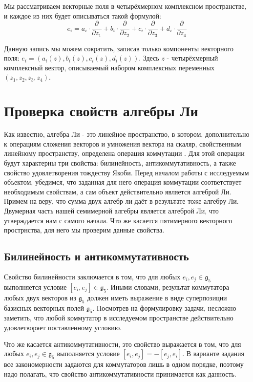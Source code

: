 \documentclass[a4paper]{article}
\begin{document}
Мы рассматриваем векторные поля в четырёхмерном комплексном пространстве, и каждое из них будет описываться такой формулой:
\begin{equation}
e_{i} = a_{i} \cdot \frac{\partial}{\partial z_{1}} + b_{i} \cdot \frac{\partial}{\partial z_{2}} + c_{i} \cdot \frac{\partial}{\partial z_{3}} + d_{i} \cdot \frac{\partial}{\partial z_{4}}
\end{equation}

Данную запись мы можем сократить, записав только компоненты векторного поля: $e_{i} = (a_{i}(z), b_{i}(z), c_{i}(z), d_{i}(z))$. Здесь $z$ - четырёхмерный комплексный вектор, описываемый набором комплексных переменных  $(z_{1}, z_{2}, z_{3}, z_{4})$.

\newpage
\section{Проверка свойств алгебры Ли}
Как известно, алгебра Ли - это линейное пространство, в котором, дополнительно к операциям сложения векторов и умножения вектора на скаляр, свойственным линейному пространству, определена операция коммутации \cite[с.~35]{Kostrikin}. Для этой операции будут характерны три свойства: билинейность, антикоммутативность, а также свойство удовлетворения тождеству Якоби\cite[с.~38]{Kostrikin}. Перед началом работы с исследуемым объектом, убедимся, что заданная для него операция коммутации соответствует необходимым свойствам, а сам объект действительно является алгеброй Ли. Примем на веру, что сумма двух алгебр ли даёт в результате тоже алгебру Ли. Двумерная часть нашей семимерной алгебры является алгеброй Ли, что утверждается нам с самого начала. Что же касается пятимерного векторного прострнства, для него мы проверим данные свойства.

\subsection{Билинейность и антикоммутативность}
Свойство билинейности заключается в том, что для любых $e_{i}, e_{j} \in \mathfrak{g}_{5}$ выполняется условие $[e_{i}, e_{j}] \in \mathfrak{g}_{5}$. Иными словами, результат коммутатора любых двух векторов из $\mathfrak{g}_{5}$ должен иметь выражение в виде суперпозиции базисных векторных полей $\mathfrak{g}_{5}$. Посмотрев на формулировку задачи, несложно заметить, что любой коммутатор в исследуемом пространстве действительно удовлетворяет поставленному условию.

Что же касается антикоммутативности, это свойство выражается в том, что для любых $e_{i}, e_{j} \in \mathfrak{g}_{5}$ выполняется условие $[e_{i}, e_{j}] = - [e_{j}, e_{i}]$. В варианте задания все закономерности задаются для коммутаторов лишь в одном порядке, поэтому надо полагать, что свойство антикоммутативности принимается как данность.
\end{document}
